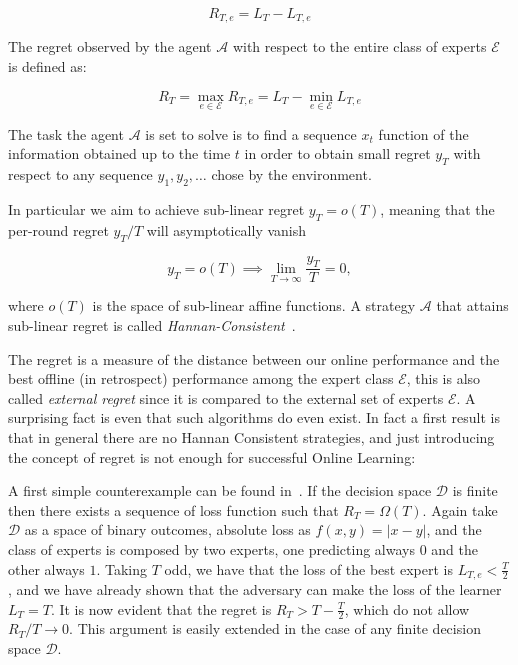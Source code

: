 \begin{equation}\label{def:Regret}
	R_{T,e} = L_T-L_{T,e}
\end{equation}

The regret observed by the agent $\mathcal A$ with respect to the entire class of experts $\mathcal E$ is defined as:

\begin{equation}
	R_T=\max\limits_{e\in\mathcal E}R_{T,e}=L_T-\min\limits_{e\in\mathcal E}L_{T,e}
\end{equation}

The task the agent $\mathcal A$ is set to solve is to find a sequence $x_t$ function of the information obtained up to the time $t$ in order to obtain small regret $y_T$ with respect to any sequence $y_1,y_2,\ldots$ chose by the environment.

In particular we aim to achieve sub-linear regret $y_T= o(T)$, meaning that the per-round regret $y_T/T$ will asymptotically vanish 

\begin{equation}
	y_T= o(T) \implies \lim\limits_{T\to \infty}\frac{y_T}{T}=0,
\end{equation}

where $ o(T)$ is the space of sub-linear affine functions. A strategy $\mathcal A$ that attains sub-linear regret is called \emph{Hannan-Consistent}~\cite{hannan1957approximation}.

The regret is a measure of the distance between our online performance and the best offline (in retrospect) performance among the expert class $\mathcal E$, this is also called \emph{external regret} since it is compared to the external set of experts $\mathcal E$. A surprising fact is even that such algorithms do even exist.
In fact a first result is that in general there are no Hannan Consistent strategies, and just introducing the concept of regret is not enough for successful Online Learning: 

A first simple counterexample can be found in~\cite{cover1966behavior}. If the decision space $\mathcal D$ is finite then there exists a sequence of loss function such that $R_T=\Omega(T)$.
Again take $\mathcal D$ as a space of binary outcomes, absolute loss as $f(x,y)=|x - y|$, and the class of experts is composed by two experts, one predicting always $0$ and the other always $1$. Taking $T$ odd, we have that the loss of the best expert is $L_{T,e}<\frac{T}{2}$, and we have already shown that the adversary can make the loss of the learner $L_T=T$. It is now evident that the regret is $R_T>T-\frac{T}{2}$, which do not allow $R_T/T\to 0$. This argument is easily extended in the case of any finite decision space $\mathcal D$.

